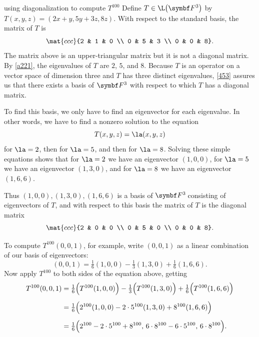\begin{example}{using diagonalization to compute\/ $T^{100}$}
Define $T \in \L\paren[\big]{\F3}$ by $T(x, y, z) = (2x + y, 5y + 3z, 8z)$.
With respect to the standard basis, the matrix of $T$ is
\[
\mat{ccc}{2 & 1 & 0 \\
0 & 5 & 3 \\
0 & 0 & 8}.
\]
The matrix above is an upper-triangular matrix but it is not a diagonal matrix. By \ref{a221}, the eigenvalues of $T$ are $2$, $5$, and $8$. Because $T$ is an operator on a vector space of dimension three and $T$ has three distinct eigenvalues, \ref{453} assures us that there exists a basis of $\F3$ with respect to which $T$ has a diagonal matrix.

To find this basis, we only have to find an eigenvector for each eigenvalue. In other words, we have to find a nonzero solution to the equation
\[
T(x, y, z) = \la(x, y, z)
\]
for $\la = 2$, then for $\la = 5$, and then for $\la = 8$. Solving these simple equations shows that for $\la = 2$ we have an eigenvector
$(1, 0, 0)$, for $\la = 5$ we have an eigenvector $(1, 3, 0)$, and for $\la = 8$ we have an eigenvector $(1, 6, 6)$.

Thus $(1, 0, 0), (1, 3, 0), (1, 6, 6) $ is a basis of $\FF3$ consisting of eigenvectors of $T$, and with respect to this basis the matrix of $T$ is the diagonal matrix
\[
\mat{ccc}{2 & 0 & 0 \\
0 & 5 & 0 \\
0 & 0 & 8}.
\]

To compute $T^{100}(0, 0, 1)$, for example, write $(0, 0,1)$ as a linear combination of our basis of eigenvectors:
\[
(0, 0, 1) =\tfrac{1}{6} (1,0,0) - \tfrac{1}{3} (1,3, 0) + \tfrac{1}{6}(1,6, 6).
\]
Now apply $T^{100}$ to both sides of the equation above, getting
\begin{align*}
T^{100}(0,0,1) &= \tfrac{1}{6} \paren[\Big]{ T^{100}(1,0,0) }- \tfrac{1}{3} \paren[\Big]{ T^{100} (1,3,0)} + \tfrac{1}{6} \paren[\Big]{T^{100} (1,6,6) } \\[5bp]
&= \tfrac{1}{6} \paren[\Big]{ 2^{100}(1,0,0) - 2 \cdot 5^{100} (1,3,0) + 8^{100} (1,6,6) } \\[5bp]
&= \tfrac{1}{6} \paren[\Big]{ 2^{100} - 2 \cdot 5^{100} + 8^{100},\, 6 \cdot 8^{100} - 6 \cdot 5^{100},\,
6 \cdot 8^{100} }.
\end{align*}
\vspace{-.25in}
\end{example}

\pagebreak[3]

